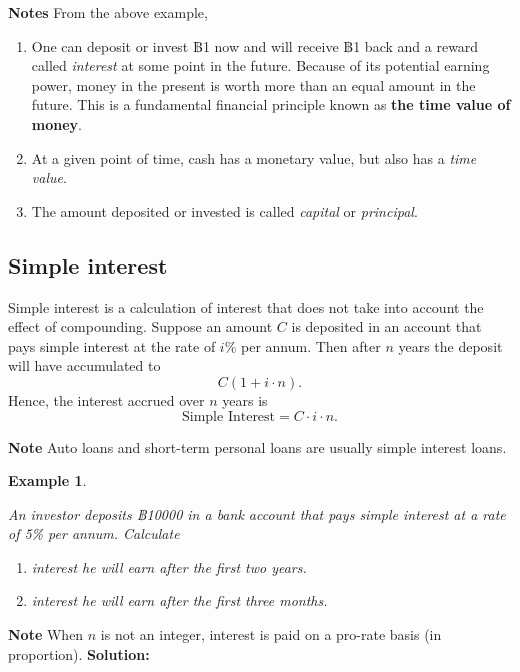 \documentclass[landscape, 20pt]{extreport}
\theoremstyle{definition}
\theoremstyle{definition}
\newtheorem{example}{Example}[chapter]
\theoremstyle{definition}
\theoremstyle{definition}
\theoremstyle{remark}
\begin{document}
\textbf{Notes} From the above example,

\begin{enumerate}
\def\labelenumi{\arabic{enumi}.}
\item
  One can deposit or invest ฿1 now and will receive ฿1 back and a
  reward called \emph{interest} at some point in the future. Because of its
  potential earning power, money in the present is worth more than an
  equal amount in the future. This is a fundamental financial
  principle known as \textbf{the time value of money}.
\item
  At a given point of time, cash has a monetary value, but also has a
  \emph{time value}.
\item
  The amount deposited or invested is called \emph{capital} or \emph{principal}.
\end{enumerate}

\hypertarget{simple-interest}{%
\subsection{Simple interest}\label{simple-interest}}

Simple interest is a calculation of interest that does not take into
account the effect of compounding. Suppose an amount \(C\) is deposited in
an account that pays simple interest at the rate of \(i\)\% per annum. Then
after \(n\) years the deposit will have accumulated to
\[C( 1 + i \cdot n).\] Hence, the interest accrued over \(n\) years is
\[\text{Simple Interest}  = C \cdot i \cdot n.\]

\textbf{Note} Auto loans and short-term personal loans are usually simple
interest loans.

\newpage \begin{example}
\protect\hypertarget{exm:unlabeled-div-3}{}\label{exm:unlabeled-div-3}

\emph{An investor deposits ฿10000 in a bank account that
pays simple interest at a rate of 5\% per annum. Calculate}

\begin{enumerate}
\def\labelenumi{\arabic{enumi}.}
\item
  \emph{interest he will earn after the first two years.}
\item
  \emph{interest he will earn after the first three months.}
\end{enumerate}

\end{example}

\textbf{Note} When \(n\) is not an integer, interest is paid on a pro-rate
basis (in proportion). \textbf{Solution:}
\end{document}
